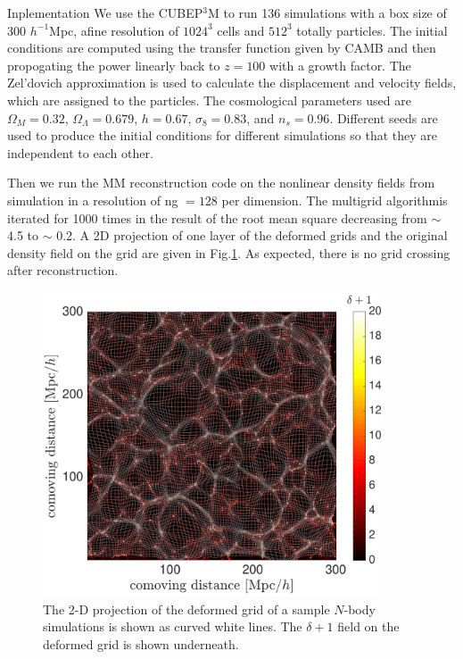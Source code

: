 \begin{section}{Inplementation}
  \label{sec:simulation}
  We use the \textsc{CUBEP$^3$M} \cite{bib:Harnois2013} to run 136
  simulations with a box size of 300 $h^{-1}$Mpc, afine resolution of
  $1024^3$ cells and $512^3$ totally particles.  The initial
  conditions are computed using the transfer function given by CAMB
  \cite{bib:Lewis2000} and then propogating the power linearly back to
  $z=100$ with a growth factor.  The Zel'dovich approximation is used
  to calculate the displacement and velocity fields, which are
  assigned to the particles.  The cosmological parameters used are
  $\Omega_M=0.32$, $\Omega_{\Lambda}=0.679$, $h=0.67$,
  $\sigma_8=0.83$, and $n_s=0.96$.  Different seeds are used to
  produce the initial conditions for different simulations so that
  they are independent to each other.

  Then we run the MM reconstruction code on the nonlinear density
  fields from simulation in a resolution of ng $=128$ per
  dimension. The multigrid algorithmis iterated for 1000 times in the
  result of the root mean square decreasing from $\sim$ 4.5 to $\sim$
  0.2.  A 2D projection of one layer of the deformed grids and the
  original density field on the grid are given in
  Fig.\ref{fig:simandrec}.  As expected, there is no grid crossing
  after reconstruction.


\begin{figure}[t!]
  \centering
  \includegraphics[width=0.9\textwidth]{fig1.pdf}
  \caption{ The 2-D projection of the deformed grid of a sample
    $N$-body simulations is shown as curved white lines. The
    $\delta+1$ field on the deformed grid is shown underneath.}
 \label{fig:simandrec}
\end{figure}

\end{section}

